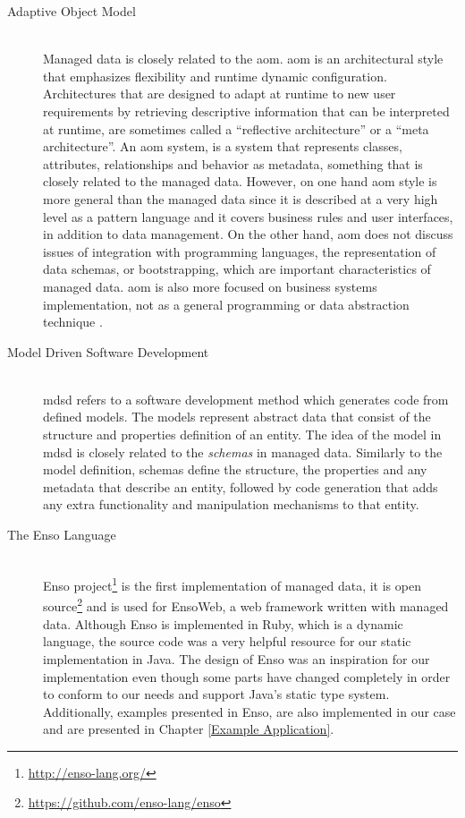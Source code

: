 \begin{description}
  \item[Adaptive Object Model]~\\
  Managed data \cite{loh2012managed} is closely related to the \ac{aom}. \ac{aom} \cite{yoder2002adaptive} is an architectural style that emphasizes flexibility and runtime dynamic configuration. 
  Architectures that are designed to adapt at runtime to new user requirements by retrieving descriptive information that can be interpreted at runtime, are sometimes called a ``reflective architecture'' or a ``meta architecture''. 
  An \ac{aom} system, is a system that represents classes, attributes, relationships and behavior as metadata, something that is closely related to the managed data.
  However, on one hand \ac{aom} style is more general than the managed data since it is described at a very high level as a pattern language and it covers business rules and user interfaces, in addition to data management. 
  On the other hand, \ac{aom} does not discuss issues of integration with programming languages, the representation of data schemas, or bootstrapping, which are important characteristics of managed data. 
  \ac{aom} is also more focused on business systems implementation, not as a general programming or data abstraction technique \cite{loh2012managed}.

  \item[Model Driven Software Development]~\\
  \ac{mdsd} refers to a software development method which generates code from defined models. 
  The models represent abstract data that consist of the structure and properties definition of an entity.
  The idea of the model in \ac{mdsd} is closely related to the \textit{schemas} in managed data.
  Similarly to the model definition, schemas define the structure, the properties and any metadata that describe an entity, followed by code generation that adds any extra functionality and manipulation mechanisms to that entity.

  \item[The Enso Language]~\\
  Enso project\footnote{\url{http://enso-lang.org/}} is the first implementation of managed data, 
  it is open source\footnote{\url{https://github.com/enso-lang/enso}} and is used for EnsoWeb, a web framework written with managed data.
  Although Enso is implemented in Ruby, which is a dynamic language, the source code was a very helpful resource for our static implementation in Java. 
  The design of Enso was an inspiration for our implementation even though some parts have changed completely in order to conform to our needs and support Java's static type system.
  Additionally, examples presented in Enso, are also implemented in our case and are presented in Chapter \ref{Example Application}.


\end{description}
